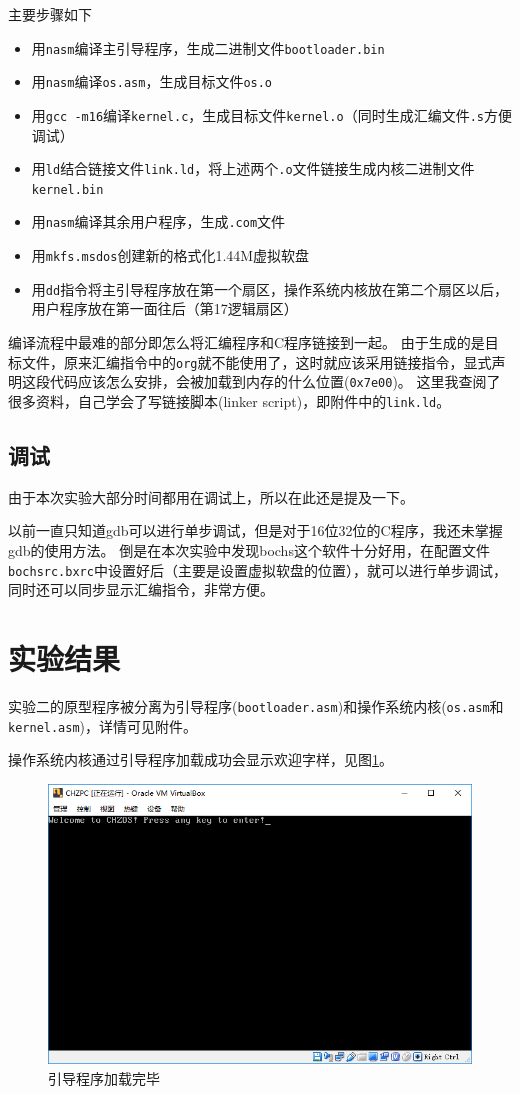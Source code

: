 \documentclass[logo,reportComp]{thesis}
\begin{document}
主要步骤如下
\begin{itemize}
    \item 用\verb'nasm'编译主引导程序，生成二进制文件\verb'bootloader.bin'
    \item 用\verb'nasm'编译\verb'os.asm'，生成目标文件\verb'os.o'
    \item 用\verb'gcc -m16'编译\verb'kernel.c'，生成目标文件\verb'kernel.o'（同时生成汇编文件\verb'.s'方便调试）
    \item 用\verb'ld'结合链接文件\verb'link.ld'，将上述两个\verb'.o'文件链接生成内核二进制文件\verb'kernel.bin'
    \item 用\verb'nasm'编译其余用户程序，生成\verb'.com'文件
    \item 用\verb'mkfs.msdos'创建新的格式化1.44M虚拟软盘
    \item 用\verb'dd'指令将主引导程序放在第一个扇区，操作系统内核放在第二个扇区以后，用户程序放在第一面往后（第17逻辑扇区）
\end{itemize}

编译流程中最难的部分即怎么将汇编程序和C程序链接到一起。
由于生成的是目标文件，原来汇编指令中的\verb'org'就不能使用了，这时就应该采用链接指令，显式声明这段代码应该怎么安排，会被加载到内存的什么位置(\verb'0x7e00')。
这里我查阅了很多资料，自己学会了写链接脚本(linker script)，即附件中的\verb'link.ld'。

\subsection{调试}
由于本次实验大部分时间都用在调试上，所以在此还是提及一下。

以前一直只知道gdb可以进行单步调试，但是对于16位32位的C程序，我还未掌握gdb的使用方法。
倒是在本次实验中发现bochs这个软件十分好用，在配置文件\verb'bochsrc.bxrc'中设置好后（主要是设置虚拟软盘的位置），就可以进行单步调试，同时还可以同步显示汇编指令，非常方便。

\section{实验结果}
实验二的原型程序被分离为引导程序(\verb'bootloader.asm')和操作系统内核(\verb'os.asm'和\verb'kernel.asm')，详情可见附件。

操作系统内核通过引导程序加载成功会显示欢迎字样，见图\ref{fig:bootloader}。
\begin{figure}[H]
\centering
\includegraphics[width=0.8\linewidth]{fig/bootloader.PNG}
\caption{引导程序加载完毕}
\label{fig:bootloader}
\end{figure}
\end{document}
